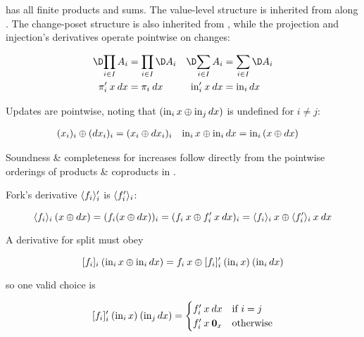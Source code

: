 \documentclass{rntz}\usepackage{fantasy}%
\begin{document}
\CP{} has all finite products and sums. The value-level structure is inherited
from \Poset{} along \valfn{}. The change-poset structure is also inherited from
\Poset{}, while the projection and injection's derivatives operate pointwise on
changes:

\nopagebreak[2]
\begin{align*}
  \chgs{\prod_{i \in I} A_i} &= \prod_{i \in I} \chgs A_i &
  \chgs{\sum_{i \in I} A_i} &= \sum_{i \in I} \chgs A_i
  \\
  \deriv\pi_i\<x\<\dx &= \pi_i\<\dx & \deriv\injc_i\<x\<\dx &= \inj i \dx
\end{align*}

\noindent Updates are pointwise, noting that $(\mathrm{in}_{i}\, x \mathbin{\oplus} \mathrm{in}_{j}\, {dx})$ is
undefined for $i \ne j$:

\nopagebreak[2]
\begin{align*}
  (x_i)_i \mathbin{\oplus} ({dx}_i)_i &= (x_i \mathbin{\oplus} {dx}_i)_i &
  \mathrm{in}_{i}\, x \mathbin{\oplus} \mathrm{in}_{i}\, {dx} &= \mathrm{in}_{i}\, (x \mathbin{\oplus} {dx})
\end{align*}

\noindent
Soundness \& completeness for increases follow directly from the pointwise
orderings of products \& coproducts in \Poset{}.

Fork's derivative $\langle{f_i}\rangle_i'$ is $\langle{\ensuremath{f'}_i}\rangle_i$:

\nopagebreak[2]
\begin{equation*}
  \fork{f_i}_i \<(x \upd \dx)
  = (f_i(x \upd \dx))_i
  = (f_i\<x \upd \deriv f_i \<x \<\dx)_i
  = \fork{f_i}_i \<x \upd \fork{\deriv f_i}_i \<x \<\dx
\end{equation*}

\noindent
A derivative for split must obey

\nopagebreak[2]
\begin{equation*}
\krof{f_i}_i\<(\inj i x \upd \inj i \dx)
= f_i\<x \upd \deriv{\krof{f_i}_i} \<(\inj i x) \<(\inj i \dx)
\end{equation*}

\noindent
so one valid choice is

\nopagebreak[2]
\begin{equation*}
  \deriv{\krof{f_i}_i} \<(\inj i x) \<(\inj j \dx)
  =
  \begin{cases}
    \deriv f_i \<x \<\dx & \text{if}~i = j\\
    \deriv f_i \<x \<\zero_x & \text{otherwise}
  \end{cases}
\end{equation*}
\end{document}
